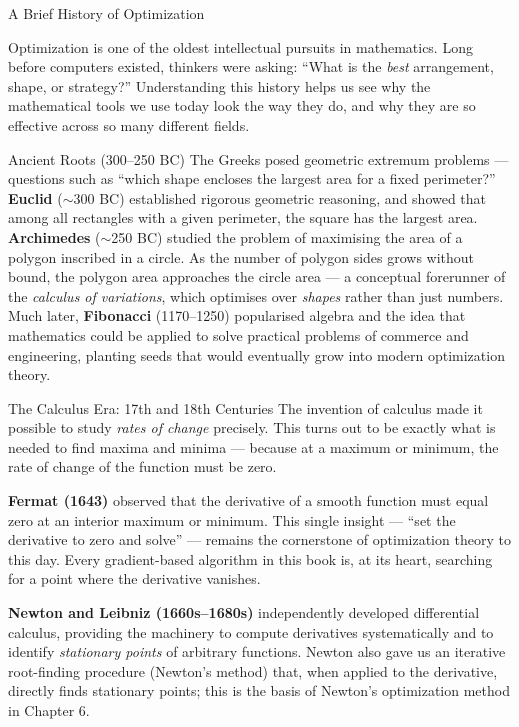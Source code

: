 \documentclass[aspectratio=169,10pt]{beamer}
\begin{document}
\begin{frame}[allowframebreaks]{A Brief History of Optimization}

Optimization is one of the oldest intellectual pursuits in mathematics.
Long before computers existed, thinkers were asking: ``What is the \emph{best}
arrangement, shape, or strategy?''  Understanding this history helps us see
why the mathematical tools we use today look the way they do, and why they
are so effective across so many different fields.

  \begin{block}{Ancient Roots (300--250 BC)}
    The Greeks posed geometric extremum problems --- questions such as ``which
    shape encloses the largest area for a fixed perimeter?''  \textbf{Euclid}
    ($\sim$300 BC) established rigorous geometric reasoning, and showed that among
    all rectangles with a given perimeter, the square has the largest area.
    \textbf{Archimedes} ($\sim$250 BC) studied the problem of maximising the area
    of a polygon inscribed in a circle.  As the number of polygon sides grows
    without bound, the polygon area approaches the circle area --- a conceptual
    forerunner of the \emph{calculus of variations}, which optimises over
    \emph{shapes} rather than just numbers.  Much later, \textbf{Fibonacci}
    (1170--1250) popularised algebra and the idea that mathematics could be
    applied to solve practical problems of commerce and engineering, planting
    seeds that would eventually grow into modern optimization theory.
  \end{block}

  \framebreak

  \begin{block}{The Calculus Era: 17th and 18th Centuries}
    The invention of calculus made it possible to study \emph{rates of change}
    precisely.  This turns out to be exactly what is needed to find maxima and
    minima --- because at a maximum or minimum, the rate of change of the function
    must be zero.

    \medskip
    \textbf{Fermat (1643)} observed that the derivative of a smooth function
    must equal zero at an interior maximum or minimum.  This single insight ---
    ``set the derivative to zero and solve'' --- remains the cornerstone of
    optimization theory to this day.  Every gradient-based algorithm in this book
    is, at its heart, searching for a point where the derivative vanishes.

    \medskip
    \textbf{Newton and Leibniz (1660s--1680s)} independently developed
    differential calculus, providing the machinery to compute derivatives
    systematically and to identify \emph{stationary points} of arbitrary
    functions.  Newton also gave us an iterative root-finding procedure
    (Newton's method) that, when applied to the derivative, directly finds
    stationary points; this is the basis of Newton's optimization method
    in Chapter 6.


\end{block}
\end{frame}
\end{document}

